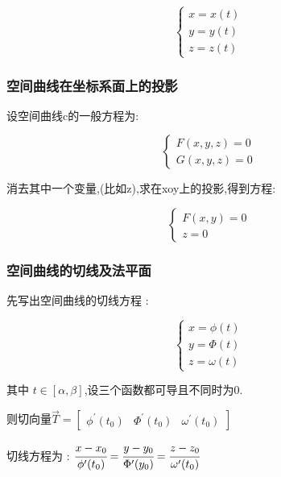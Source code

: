 \documentclass[UTF8,12pt]{ctexbook}
\newcommand{\derivative}{^\prime}
\begin{document}
{{{{\begin{enumerate}
{              $$
                \begin{cases}
                  x = x(t) \\
                  y = y(t) \\
                  z = z(t)
                \end{cases}
              $$
              }
      \end{enumerate}
    }%

    \subsubsection{空间曲线在坐标系面上的投影}{

      设空间曲线c的一般方程为:

      $$
        \begin{cases}
          F(x,y,z) = 0 \\
          G(x,y,z) = 0
        \end{cases}
      $$

      消去其中一个变量,(比如z),求在xoy上的投影,得到方程:

      $$
        \begin{cases}
          F(x,y) = 0 \\
          z = 0
        \end{cases}
      $$
    }%

    \subsubsection{空间曲线的切线及法平面}{
      先写出空间曲线的切线方程 :

      $$
        \begin{cases}
          x = \phi(t) \\
          y = \Phi(t) \\
          z = \omega(t)
        \end{cases}
      $$

      其中 $t \in [\alpha,\beta]$,设三个函数都可导且不同时为0.

      则切向量$\vec{T} = \begin{bmatrix}
          \phi\derivative(t_0) & \Phi\derivative(t_0) & \omega\derivative(t_0)
        \end{bmatrix}$

      切线方程为 : $\cfrac{x - x_0}{\phi\derivative(t_0)} = \cfrac{y - y_0}{\Phi\derivative(y_0)} = \cfrac{z - z_0}{\omega\derivative(t_0)}$

}}}}
\end{document}
